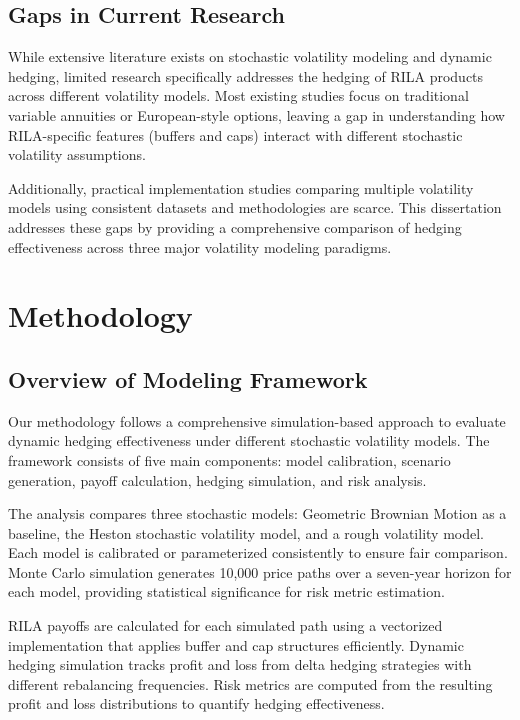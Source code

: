 \documentclass[12pt,a4paper]{report}
\begin{document}
\section{Gaps in Current Research}

While extensive literature exists on stochastic volatility modeling and dynamic hedging, limited research specifically addresses the hedging of RILA products across different volatility models. Most existing studies focus on traditional variable annuities or European-style options, leaving a gap in understanding how RILA-specific features (buffers and caps) interact with different stochastic volatility assumptions.

Additionally, practical implementation studies comparing multiple volatility models using consistent datasets and methodologies are scarce. This dissertation addresses these gaps by providing a comprehensive comparison of hedging effectiveness across three major volatility modeling paradigms.

\chapter{Methodology}

\section{Overview of Modeling Framework}

Our methodology follows a comprehensive simulation-based approach to evaluate dynamic hedging effectiveness under different stochastic volatility models. The framework consists of five main components: model calibration, scenario generation, payoff calculation, hedging simulation, and risk analysis.

The analysis compares three stochastic models: Geometric Brownian Motion as a baseline, the Heston stochastic volatility model, and a rough volatility model. Each model is calibrated or parameterized consistently to ensure fair comparison. Monte Carlo simulation generates 10,000 price paths over a seven-year horizon for each model, providing statistical significance for risk metric estimation.

RILA payoffs are calculated for each simulated path using a vectorized implementation that applies buffer and cap structures efficiently. Dynamic hedging simulation tracks profit and loss from delta hedging strategies with different rebalancing frequencies. Risk metrics are computed from the resulting profit and loss distributions to quantify hedging effectiveness.
\end{document}
